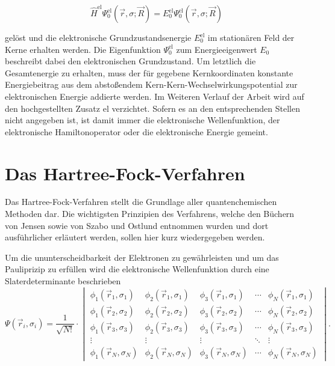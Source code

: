 \begin{equation}
  \hat{H}^{\text{el}}\Psi^{\text{el}}_0(\vec{r},\sigma;\vec{R})=E^{\text{el}}_0\Psi^{\text{el}}_0(\vec{r},\sigma;\vec{R})
\end{equation}

gelöst und die elektronische Grundzustandsenergie $E^{\text{el}}_0$ im stationären Feld der Kerne erhalten werden. Die Eigenfunktion $\Psi^{\text{el}}_0$ zum Energieeigenwert $E_0$ beschreibt dabei den elektronischen Grundzustand. Um letztlich die Gesamtenergie zu erhalten, muss der für gegebene Kernkoordinaten konstante Energiebeitrag aus dem abstoßendem Kern-Kern-Wechselwirkungspotential zur elektronischen Energie addierte werden. Im Weiteren Verlauf der Arbeit wird auf den hochgestellten Zusatz \glqq el\grqq{} verzichtet. Sofern es an den entsprechenden Stellen nicht angegeben ist, ist damit immer die elektronische Wellenfunktion, der elektronische Hamiltonoperator oder die elektronische Energie gemeint.


\section{Das Hartree-Fock-Verfahren}
Das Hartree-Fock-Verfahren stellt die Grundlage aller quantenchemischen Methoden dar. Die wichtigsten Prinzipien des Verfahrens, welche den Büchern von Jensen\supercite{jensen2009introduction} sowie von Szabo und Ostlund\supercite{szabo1982modern} entnommen wurden und dort ausführlicher erläutert werden, sollen hier kurz wiedergegeben werden. 

Um die ununterscheidbarkeit der Elektronen zu gewährleisten und um das Pauliprizip zu erfüllen wird die elektronische Wellenfunktion durch eine Slaterdeterminante\supercite{slater1974self} beschrieben
\begin{equation}
\Psi(\vec{r}_i,\sigma_i)=\frac{1}{\sqrt{N!}}\cdot\begin{vmatrix}
\phi_1(\vec{r}_1,\sigma_1) & \phi_2(\vec{r}_1,\sigma_1) & \phi_3(\vec{r}_1,\sigma_1) &\cdots & \phi_N(\vec{r}_1,\sigma_1) \\
\phi_1(\vec{r}_2,\sigma_2) & \phi_2(\vec{r}_2,\sigma_2) & \phi_3(\vec{r}_2,\sigma_2) &\cdots & \phi_N(\vec{r}_2,\sigma_2) \\
\phi_1(\vec{r}_3,\sigma_3) & \phi_2(\vec{r}_3,\sigma_3) & \phi_3(\vec{r}_3,\sigma_3) &\cdots & \phi_N(\vec{r}_3,\sigma_3) \\
\vdots & \vdots & \vdots & \ddots & \vdots\\
\phi_1(\vec{r}_N,\sigma_N) & \phi_2(\vec{r}_N,\sigma_N) & \phi_3(\vec{r}_N,\sigma_N) &\cdots & \phi_N(\vec{r}_N,\sigma_N)
\end{vmatrix}.
\end{equation}

